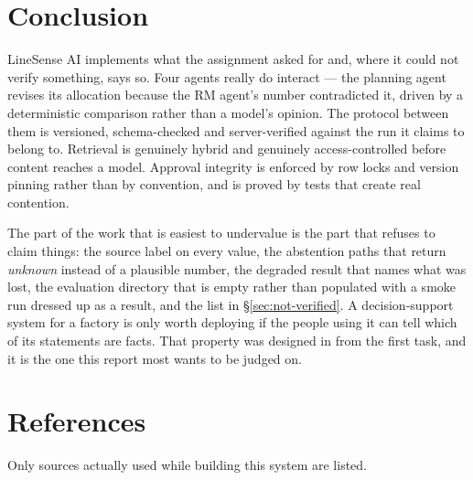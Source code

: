 \documentclass[11pt,a4paper]{article}
\begin{document}
\section{Conclusion}

LineSense AI implements what the assignment asked for and, where it could not
verify something, says so. Four agents really do interact --- the planning agent
revises its allocation because the RM agent's number contradicted it, driven by
a deterministic comparison rather than a model's opinion. The protocol between
them is versioned, schema-checked and server-verified against the run it claims
to belong to. Retrieval is genuinely hybrid and genuinely access-controlled
before content reaches a model. Approval integrity is enforced by row locks and
version pinning rather than by convention, and is proved by tests that create
real contention.

The part of the work that is easiest to undervalue is the part that refuses to
claim things: the source label on every value, the abstention paths that return
\emph{unknown} instead of a plausible number, the degraded result that names
what was lost, the evaluation directory that is empty rather than populated with
a smoke run dressed up as a result, and the list in \S\ref{sec:not-verified}. A
decision-support system for a factory is only worth deploying if the people using
it can tell which of its statements are facts. That property was designed in
from the first task, and it is the one this report most wants to be judged on.

\section*{References}

Only sources actually used while building this system are listed.
\end{document}
